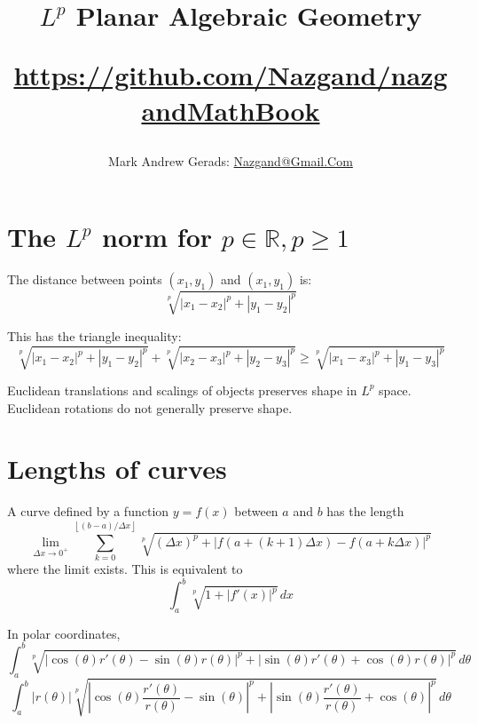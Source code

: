 \documentclass[]{article}
\author{Mark Andrew Gerads: \href{MailTo:Nazgand@Gmail.Com}{Nazgand@Gmail.Com}}
\title{
	$L^p$ Planar Algebraic Geometry
	
	\href{https://github.com/Nazgand/nazgandMathBook}{https://github.com/Nazgand/nazgandMathBook}
}
\newcommand{\paren}[1]{{\left(#1\right)}}
\newcommand{\abs}[1]{{\left\lvert#1\right\rvert}}
\newcommand{\floor}[1]{{\left\lfloor#1\right\rfloor}}
\begin{document}
\maketitle

\begin{abstract}

\end{abstract}

\section{The $L^p$ norm for $p\in\mathbb{R},p\geq 1$}
The distance between points $\paren{x_1,y_1}$ and $\paren{x_1,y_1}$ is:
\begin{equation}
\sqrt[p]{\abs{x_1-x_2}^p+\abs{y_1-y_2}^p}
\end{equation}

This has the triangle inequality:
\begin{equation}
\sqrt[p]{\abs{x_1-x_2}^p+\abs{y_1-y_2}^p}+
\sqrt[p]{\abs{x_2-x_3}^p+\abs{y_2-y_3}^p}\geq
\sqrt[p]{\abs{x_1-x_3}^p+\abs{y_1-y_3}^p}
\end{equation}

Euclidean translations and scalings of objects preserves shape in $L^p$ space. Euclidean rotations do not generally preserve shape.

\section{Lengths of curves}
A curve defined by a function $y=f\paren{x}$ between $a$ and $b$ has the length
\begin{equation}
\lim\limits_{\Delta x\rightarrow 0^+}\sum_{k=0}^{\floor{\paren{b-a}/\Delta x}}
\sqrt[p]{\paren{\Delta x}^p+\abs{f\paren{a+\paren{k+1}\Delta x}-f\paren{a+k\Delta x}}^p}
\end{equation}
where the limit exists. This is equivalent to
\begin{equation}
\int_{a}^{b}
\sqrt[p]{1+\abs{f'\paren{x}}^p} \,dx
\end{equation}

In polar coordinates,
\begin{equation}
\int_{a}^{b}
\sqrt[p]{\abs{\cos\paren{\theta}r'\paren{\theta}-\sin\paren{\theta}r\paren{\theta}}^p
	+\abs{\sin\paren{\theta}r'\paren{\theta}+\cos\paren{\theta}r\paren{\theta}}^p
} \,d\theta
\end{equation}
\begin{equation}
\label{CurveLengthPolar2}
\int_{a}^{b}
\abs{r\paren{\theta}}
\sqrt[p]{\abs{\cos\paren{\theta}\frac{r'\paren{\theta}}{r\paren{\theta}}-\sin\paren{\theta}}^p
	+\abs{\sin\paren{\theta}\frac{r'\paren{\theta}}{r\paren{\theta}}+\cos\paren{\theta}}^p
} \,d\theta
\end{equation}
\end{document}
